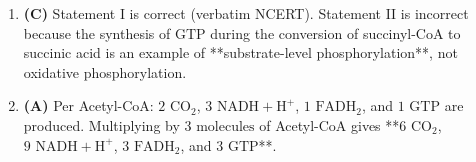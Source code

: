\documentclass[11pt, a4paper]{article}
\begin{document}
\begin{enumerate}[label=\textbf{\arabic*.}]
\item \textbf{(C)} Statement I is correct (verbatim NCERT). Statement II is incorrect because the synthesis of $\text{GTP}$ during the conversion of succinyl-CoA to succinic acid is an example of **substrate-level phosphorylation**, not oxidative phosphorylation.

\item \textbf{(A)} Per Acetyl-CoA: $2\text{ CO}_2$, $3\text{ NADH} + \text{H}^+$, $1\text{ FADH}_2$, and $1\text{ GTP}$ are produced. Multiplying by $3\text{ molecules}$ of Acetyl-CoA gives **$6\text{ CO}_2$, $9\text{ NADH} + \text{H}^+$, $3\text{ FADH}_2$, and $3\text{ GTP}$**.

\end{enumerate}
\end{document}
